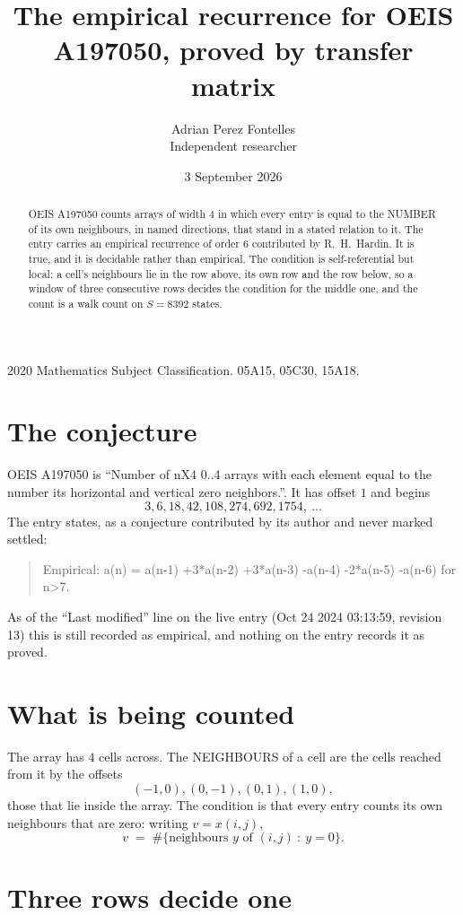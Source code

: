 \documentclass[11pt,a4paper]{article}
\title{The empirical recurrence for OEIS A197050, proved by transfer matrix}
\author{Adrian Perez Fontelles\\ \small Independent researcher}
\date{3 September 2026}
\theoremstyle{plain}
\theoremstyle{definition}
\begin{document}
\maketitle

\begin{abstract}
OEIS A197050 counts arrays of width $4$ in which every entry is equal to the NUMBER of its own
neighbours, in named directions, that stand in a stated relation to it. The entry carries an
empirical recurrence of order $6$ contributed by R.~H.~Hardin. It is true, and it is
decidable rather than empirical. The condition is self-referential but local: a cell's
neighbours lie in the row above, its own row and the row below, so a window of three
consecutive rows decides the condition for the middle one, and the count is a walk count on
$S=8392$ states.
\end{abstract}

\noindent\small 2020 Mathematics Subject Classification. 05A15, 05C30, 15A18.\normalsize

\section{The conjecture}

OEIS A197050 is ``Number of nX4 0..4 arrays with each element equal to the number its horizontal and vertical zero neighbors.''. It has offset $1$ and begins
\[
3, 6, 18, 42, 108, 274, 692, 1754,\ \dots
\]
The entry states, as a conjecture contributed by its author and never marked settled:
\begin{quote}
Empirical: a(n) = a(n-1) +3*a(n-2) +3*a(n-3) -a(n-4) -2*a(n-5) -a(n-6) for n>7.
\end{quote}
As of the ``Last modified'' line on the live entry (Oct 24 2024 03:13:59, revision 13) this is still
recorded as empirical, and nothing on the entry records it as proved.

\section{What is being counted}

The array has $4$ cells across. The NEIGHBOURS of a cell are the cells reached from it by the
offsets
\[
(-1,0), (0,-1), (0,1), (1,0),
\]
those that lie inside the array. The condition is that every entry counts its own neighbours
that are zero: writing $v=x(i,j)$,
\[
v\;=\;\#\{\text{neighbours } y \text{ of } (i,j)\ :\ y=0\} .
\]


\section{Three rows decide one}
\end{document}
